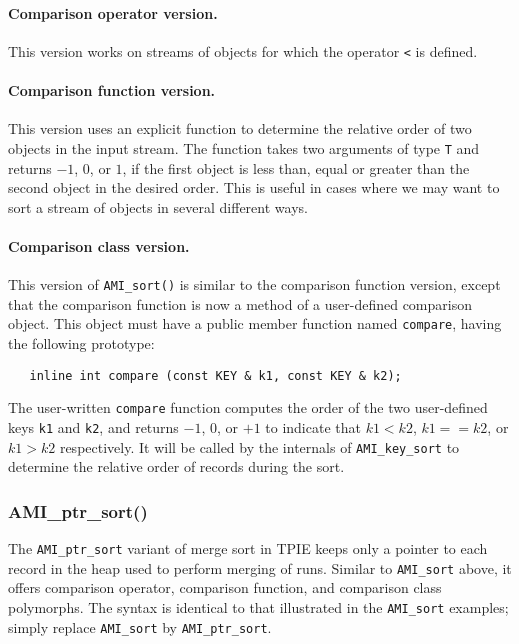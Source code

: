 \paragraph{Comparison operator version.} This version works on streams of
objects for which the operator \lstinline|<| is defined. 

\paragraph{Comparison function version.}
This version uses an explicit function to determine the
relative order of two objects in the input stream. The function takes two
arguments of type \lstinline|T| and returns $-1$, $0$, or $1$, if the first
object is less than, equal or greater than the second object in the desired
order. This is useful in cases where we may want to sort a stream of
objects in several different ways.  

\paragraph{Comparison class version.} 
This version of \lstinline|AMI_sort()| is similar to the
comparison function version, except that the comparison
function is now a method of a user-defined comparison
object. This object must have a public member function named
\lstinline|compare|, having the following prototype:
\begin{lstlisting}
   inline int compare (const KEY & k1, const KEY & k2);
\end{lstlisting}

The user-written \lstinline|compare| function computes the
order of the two user-defined keys \lstinline|k1| and
\lstinline|k2|, and returns $-1$, $0$, or $+1$ to indicate that
$k1<k2$, $k1==k2$, or $k1>k2$ respectively.
It will be called by the internals of \lstinline|AMI_key_sort| to
determine the relative order of records during the sort.



\subsubsection{AMI\_ptr\_sort()}

The \lstinline|AMI_ptr_sort| variant of merge sort in TPIE
keeps only a pointer to each record in the heap used to
perform merging of runs. Similar to \lstinline|AMI_sort|
above, it offers comparison operator, comparison function,
and comparison class polymorphs. The syntax is identical to
that illustrated in the \lstinline|AMI_sort| examples; simply
replace \lstinline|AMI_sort| by \lstinline|AMI_ptr_sort|.

